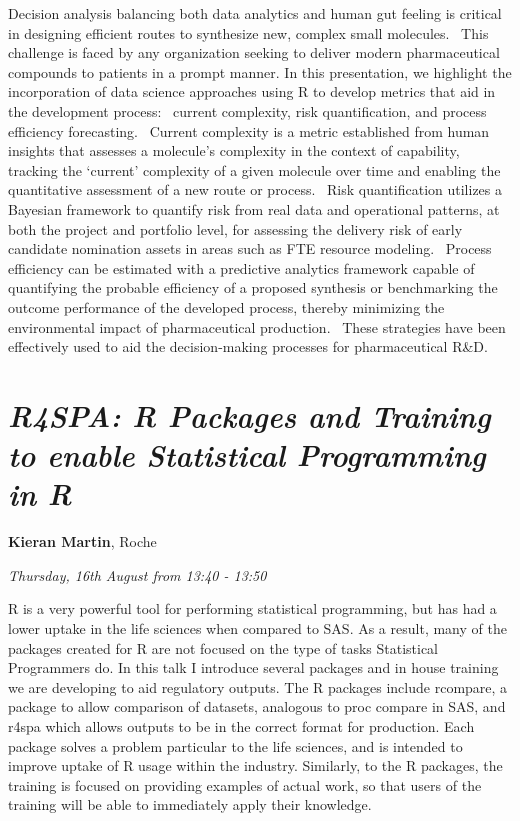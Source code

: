 \documentclass[]{book}
\theoremstyle{definition}
\theoremstyle{definition}
\theoremstyle{definition}
\theoremstyle{remark}
\begin{document}
Decision analysis balancing both data analytics and human gut feeling is
critical in designing efficient routes to synthesize new, complex small
molecules.~ This challenge is faced by any organization seeking to
deliver modern pharmaceutical compounds to patients in a prompt manner.
In this presentation, we highlight the incorporation of data science
approaches using R to develop metrics that aid in the development
process:~ current complexity, risk quantification, and process
efficiency forecasting.~ Current complexity is a metric established from
human insights that assesses a molecule's complexity in the context of
capability, tracking the `current' complexity of a given molecule over
time and enabling the quantitative assessment of a new route or
process.~ Risk quantification utilizes a Bayesian framework to quantify
risk from real data and operational patterns, at both the project and
portfolio level, for assessing the delivery risk of early candidate
nomination assets in areas such as FTE resource modeling.~ Process
efficiency can be estimated with a predictive analytics framework
capable of quantifying the probable efficiency of a proposed synthesis
or benchmarking the outcome performance of the developed process,
thereby minimizing the environmental impact of pharmaceutical
production.~ These strategies have been effectively used to aid the
decision-making processes for pharmaceutical R\&D.

\hypertarget{r4spa-r-packages-and-training-to-enable-statistical-programming-in-r}{%
\section{\texorpdfstring{\emph{R4SPA: R Packages and Training to enable
Statistical Programming in
R}}{R4SPA: R Packages and Training to enable Statistical Programming in R}}\label{r4spa-r-packages-and-training-to-enable-statistical-programming-in-r}}

\textbf{Kieran Martin}, Roche

\emph{Thursday, 16th August from 13:40 - 13:50}

R is a very powerful tool for performing statistical programming, but
has had a lower uptake in the life sciences when compared to SAS. As a
result, many of the packages created for R are not focused on the type
of tasks Statistical Programmers do. In this talk I introduce several
packages and in house training we are developing to aid regulatory
outputs. The R packages include rcompare, a package to allow comparison
of datasets, analogous to proc compare in SAS, and r4spa which allows
outputs to be in the correct format for production. Each package solves
a problem particular to the life sciences, and is intended to improve
uptake of R usage within the industry. Similarly, to the R packages, the
training is focused on providing examples of actual work, so that users
of the training will be able to immediately apply their knowledge.
\end{document}
